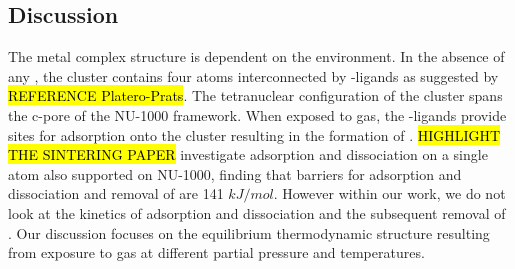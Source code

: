 \documentclass[journal=jctcce,manuscript=article]{achemso}
\begin{document}
%

\newpage
\subsection{Discussion}
The  metal complex structure is dependent on the environment. In the absence of any , the cluster contains four  atoms interconnected by -ligands as suggested by \hl{REFERENCE Platero-Prats}. The tetranuclear configuration of the  cluster spans the c-pore of the NU-1000 framework. When exposed to  gas, the -ligands provide sites for  adsorption onto the cluster resulting in the formation of .  \hl{HIGHLIGHT THE SINTERING PAPER} investigate  adsorption and dissociation on a single  atom also supported on NU-1000, finding that barriers for  adsorption and dissociation and removal of  are 141 $kJ/mol$. However within our work, we do not look at the kinetics of  adsorption and dissociation and the subsequent removal of . Our discussion focuses on the equilibrium thermodynamic structure resulting from exposure to  gas at different partial pressure and temperatures. 
\end{document}
